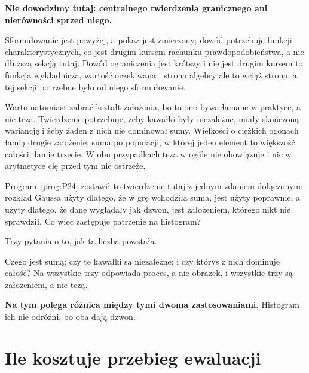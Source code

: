 \begin{fr}
\begin{rigourbox}
\textbf{Nie dowodzimy tutaj: centralnego twierdzenia granicznego ani
nierówności sprzed niego.}

Sformułowanie jest powyżej, a pokaz jest zmierzony; dowód potrzebuje funkcji
charakterystycznych, co jest drugim kursem rachunku prawdopodobieństwa, a nie
dłuższą sekcją tutaj. Dowód ograniczenia jest krótszy i nie jest drugim kursem
\dash{} to funkcja wykładnicza, wartość oczekiwana i strona algebry \dash{}
ale to wciąż strona, a tej sekcji potrzebne było od niego sformułowanie.

Warto natomiast zabrać kształt założenia, bo to ono bywa łamane w praktyce, a
nie teza. Twierdzenie potrzebuje, żeby kawałki były niezależne, miały
skończoną wariancję i żeby żaden z nich nie dominował sumy. Wielkości o
ciężkich ogonach łamią drugie założenie; suma po populacji, w której jeden
element to większość całości, łamie trzecie. W obu przypadkach teza w ogóle
nie obowiązuje i nic w arytmetyce cię przed tym nie ostrzeże.
\end{rigourbox}

Program~\ref{prog:P24} zostawił to twierdzenie tutaj z jednym zdaniem
dołączonym: rozkład Gaussa użyty dlatego, że w grę wchodziła suma, jest użyty
poprawnie, a użyty dlatego, że dane wyglądały jak dzwon, jest założeniem,
którego nikt nie sprawdził. Co więc zastępuje patrzenie na histogram?
\dotline
\nextframe
\end{fr}

\begin{fr}
\begin{ansblock}
Trzy pytania o to, jak ta liczba powstała.
\end{ansblock}

Czego jest sumą; czy te kawałki są niezależne; i czy któryś z nich dominuje
całość? Na wszystkie trzy odpowiada proces, a nie obrazek, i wszystkie trzy
są założeniem, a nie tezą.

\textbf{Na tym polega różnica między tymi dwoma zastosowaniami.} Histogram
ich nie odróżni, bo oba dają dzwon.
\end{fr}

\section{Ile kosztuje przebieg ewaluacji}
\label{sec:P25-eval-cost}

